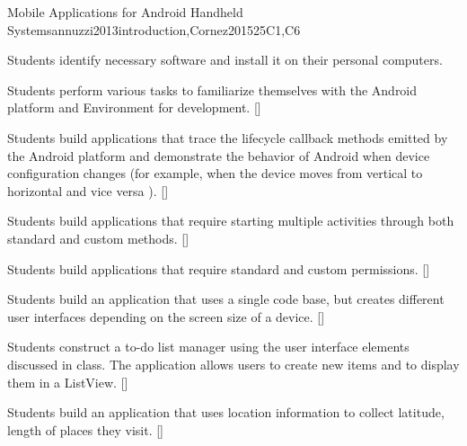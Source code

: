 \begin{syllabus}
\begin{unit}{Mobile Applications for Android Handheld Systems}{}{annuzzi2013introduction,Cornez2015}{25}{C1,C6}
\begin{learningoutcomes}
    \item Students identify necessary software and install it on their personal computers.
    \item Students perform various tasks to familiarize themselves with the Android platform and Environment for development. [\Usage]
    \item Students build applications that trace the lifecycle callback methods emitted by the Android platform and demonstrate the behavior of Android when device configuration changes (for example, when the device moves from vertical to horizontal and vice versa ). [\Usage]
    \item Students build applications that require starting multiple activities through both standard and custom methods. [\Usage]
    \item Students build applications that require standard and custom permissions. [\Usage]
    \item Students build an application that uses a single code base, but creates different user interfaces depending on the screen size of a device. [\Usage]
    \item Students construct a to-do list manager using the user interface elements discussed in class. The application allows users to create new items and to display them in a ListView. [\Usage]
    \item Students build an application that uses location information to collect latitude, length of places they visit. [\Usage]
\end{learningoutcomes}
\end{unit}

\begin{coursebibliography}
\end{coursebibliography}

\end{syllabus}
